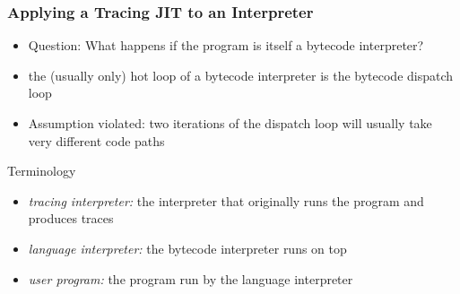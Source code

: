 \documentclass[utf8x]{beamer}
\begin{document}
\begin{frame}
    \frametitle{Applying a Tracing JIT to an Interpreter}
    \begin{itemize}
    \item Question: What happens if the program is itself a bytecode interpreter?
    \item the (usually only) hot loop of a bytecode interpreter is the bytecode dispatch loop
    \item Assumption violated: two iterations of the dispatch loop will usually take very different code paths
    \end{itemize}
    \pause
    \begin{block}{Terminology}
        \begin{itemize}
        \item \emph{tracing interpreter:} the interpreter that originally runs the program and produces traces
        \item \emph{language interpreter:} the bytecode interpreter runs on top
        \item \emph{user program:} the program run by the language interpreter
        \end{itemize}
    \end{block}
\end{frame}

\end{document}
